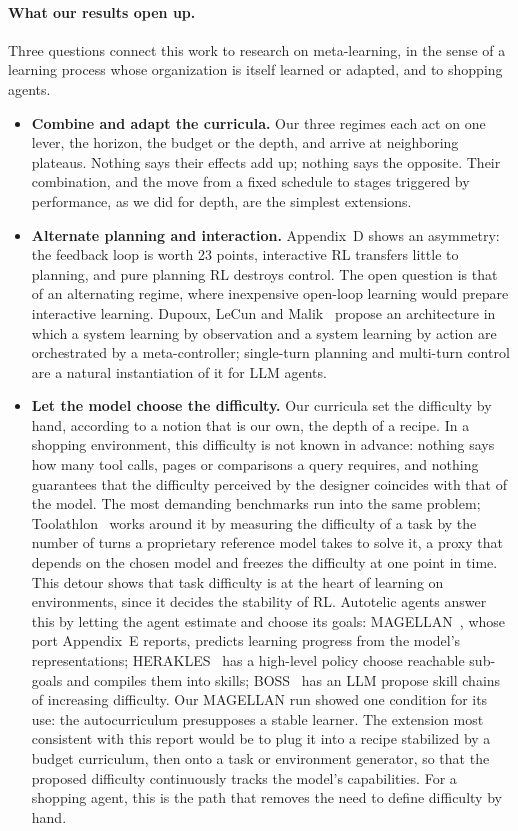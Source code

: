 \documentclass[11pt,a4paper]{article}
\begin{document}
\paragraph{What our results open up.} Three questions connect this work to research on meta-learning, in the sense of a learning process whose organization is itself learned or adapted, and to shopping agents.
\begin{itemize}
    \item \textbf{Combine and adapt the curricula.} Our three regimes each act on one lever, the horizon, the budget or the depth, and arrive at neighboring plateaus. Nothing says their effects add up; nothing says the opposite. Their combination, and the move from a fixed schedule to stages triggered by performance, as we did for depth, are the simplest extensions.
    \item \textbf{Alternate planning and interaction.} Appendix~D shows an asymmetry: the feedback loop is worth 23 points, interactive RL transfers little to planning, and pure planning RL destroys control. The open question is that of an alternating regime, where inexpensive open-loop learning would prepare interactive learning. Dupoux, LeCun and Malik~\cite{dupoux2026why} propose an architecture in which a system learning by observation and a system learning by action are orchestrated by a meta-controller; single-turn planning and multi-turn control are a natural instantiation of it for LLM agents.
    \item \textbf{Let the model choose the difficulty.} Our curricula set the difficulty by hand, according to a notion that is our own, the depth of a recipe. In a shopping environment, this difficulty is not known in advance: nothing says how many tool calls, pages or comparisons a query requires, and nothing guarantees that the difficulty perceived by the designer coincides with that of the model. The most demanding benchmarks run into the same problem; Toolathlon~\cite{toolathlon2025} works around it by measuring the difficulty of a task by the number of turns a proprietary reference model takes to solve it, a proxy that depends on the chosen model and freezes the difficulty at one point in time. This detour shows that task difficulty is at the heart of learning on environments, since it decides the stability of RL. Autotelic agents answer this by letting the agent estimate and choose its goals: MAGELLAN~\cite{gaven2025magellan}, whose port Appendix~E reports, predicts learning progress from the model's representations; HERAKLES~\cite{carta2025herakles} has a high-level policy choose reachable sub-goals and compiles them into skills; BOSS~\cite{zhang2023boss} has an LLM propose skill chains of increasing difficulty. Our MAGELLAN run showed one condition for its use: the autocurriculum presupposes a stable learner. The extension most consistent with this report would be to plug it into a recipe stabilized by a budget curriculum, then onto a task or environment generator, so that the proposed difficulty continuously tracks the model's capabilities. For a shopping agent, this is the path that removes the need to define difficulty by hand.
\end{itemize}
\end{document}
